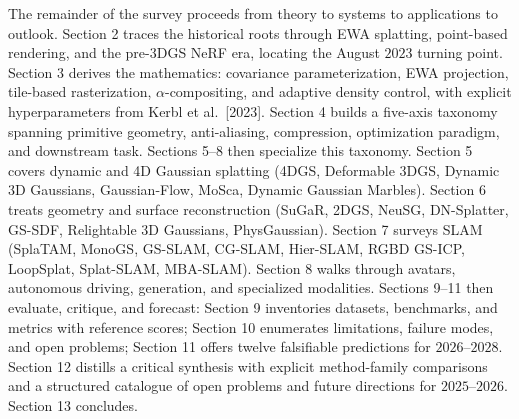The remainder of the survey proceeds from theory to systems to applications to outlook. Section 2 traces the historical roots through EWA splatting, point-based rendering, and the pre-3DGS NeRF era, locating the August \(2023\) turning point. Section 3 derives the mathematics: covariance parameterization, EWA projection, tile-based rasterization, \(\alpha\)-compositing, and adaptive density control, with explicit hyperparameters from Kerbl et al.~{[}2023{]}. Section 4 builds a five-axis taxonomy spanning primitive geometry, anti-aliasing, compression, optimization paradigm, and downstream task. Sections 5--8 then specialize this taxonomy. Section 5 covers dynamic and 4D Gaussian splatting (4DGS, Deformable 3DGS, Dynamic 3D Gaussians, Gaussian-Flow, MoSca, Dynamic Gaussian Marbles). Section 6 treats geometry and surface reconstruction (SuGaR, 2DGS, NeuSG, DN-Splatter, GS-SDF, Relightable 3D Gaussians, PhysGaussian). Section 7 surveys SLAM (SplaTAM, MonoGS, GS-SLAM, CG-SLAM, Hier-SLAM, RGBD GS-ICP, LoopSplat, Splat-SLAM, MBA-SLAM). Section 8 walks through avatars, autonomous driving, generation, and specialized modalities. Sections 9--11 then evaluate, critique, and forecast: Section 9 inventories datasets, benchmarks, and metrics with reference scores; Section 10 enumerates limitations, failure modes, and open problems; Section 11 offers twelve falsifiable predictions for \(2026\)--\(2028\). Section 12 distills a critical synthesis with explicit method-family comparisons and a structured catalogue of open problems and future directions for \(2025\)--\(2026\). Section 13 concludes.

